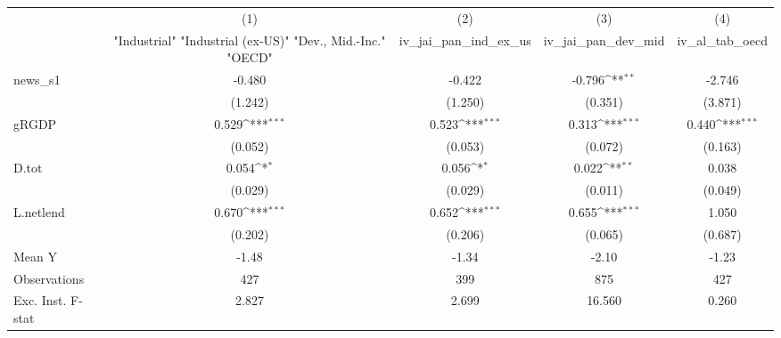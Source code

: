 {
\def\sym#1{\ifmmode^{#1}\else\(^{#1}\)\fi}
\begin{tabular}{l*{4}{c}}
\toprule
            &\multicolumn{1}{c}{(1)}&\multicolumn{1}{c}{(2)}&\multicolumn{1}{c}{(3)}&\multicolumn{1}{c}{(4)}\\
            &\multicolumn{1}{c}{ "Industrial" "Industrial (ex-US)" "Dev., Mid.-Inc." "OECD" }&\multicolumn{1}{c}{iv\_jai\_pan\_ind\_ex\_us}&\multicolumn{1}{c}{iv\_jai\_pan\_dev\_mid}&\multicolumn{1}{c}{iv\_al\_tab\_oecd}\\
\midrule
news\_s1     &      -0.480         &      -0.422         &      -0.796\sym{**} &      -2.746         \\
            &     (1.242)         &     (1.250)         &     (0.351)         &     (3.871)         \\
\addlinespace
gRGDP       &       0.529\sym{***}&       0.523\sym{***}&       0.313\sym{***}&       0.440\sym{***}\\
            &     (0.052)         &     (0.053)         &     (0.072)         &     (0.163)         \\
\addlinespace
D.tot       &       0.054\sym{*}  &       0.056\sym{*}  &       0.022\sym{**} &       0.038         \\
            &     (0.029)         &     (0.029)         &     (0.011)         &     (0.049)         \\
\addlinespace
L.netlend   &       0.670\sym{***}&       0.652\sym{***}&       0.655\sym{***}&       1.050         \\
            &     (0.202)         &     (0.206)         &     (0.065)         &     (0.687)         \\
\midrule
Mean Y      &       -1.48         &       -1.34         &       -2.10         &       -1.23         \\
Observations&         427         &         399         &         875         &         427         \\
Exc. Inst. F-stat&       2.827         &       2.699         &      16.560         &       0.260         \\
\bottomrule
\end{tabular}
}
